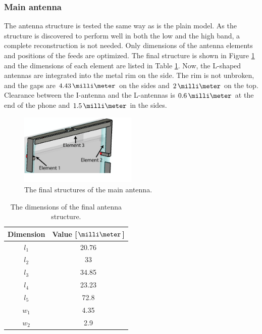 \subsubsection{Main antenna}
\label{sec:main_antenna}
The antenna structure is tested the same way as is the plain model. As the structure is discovered to perform well in both the low and the high band, a complete reconstruction is not needed. Only dimensions of the antenna elements and positions of the feeds are optimized. The final structure is shown in Figure \ref{fig:main_final} and the dimensions of each element are listed in Table \ref{tab:main_final}. Now, the L-shaped antennas are integrated into the metal rim on the side. The rim is not unbroken, and the gaps are $4.43\,\milli\meter$ on the sides and $2\,\milli\meter$ on the top. Clearance between the I-antenna and the L-antennas is $0.6\,\milli\meter$ at the end of the phone and $1.5\,\milli\meter$ in the sides.
\begin{figure}[H]
    \centering
    \vspace{-5pt}
    \includegraphics[width=0.5\textwidth]{img/main_final.eps}
    \vspace{-20pt}
    \caption{The final structures of the main antenna.}
    \label{fig:main_final}
\end{figure}
\begin{table}[H]
    \centering
    \caption{The dimensions of the final antenna structure.}
    \label{tab:main_final}
    \vspace{-5pt}
    \begin{tabular}{|c|c|}
        \hline
        \textbf{Dimension} & \textbf{Value [$\milli\meter$]}\\
        \hline
        $l_1$ & 20.76 \\
        \hline
        $l_2$ & 33\\
        \hline
        $l_3$ & 34.85 \\
        \hline
        $l_4$ & 23.23 \\
        \hline
        $l_5$ & 72.8 \\
        \hline
        $w_1$ & 4.35\\
        \hline
        $w_2$ & 2.9\\
        \hline
    \end{tabular}
    \vspace{-10pt}
\end{table}

